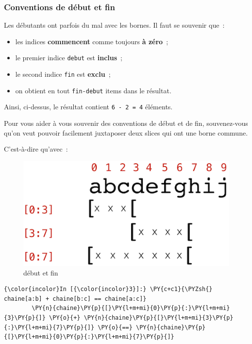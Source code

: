     \hypertarget{conventions-de-duxe9but-et-fin}{%
\subsubsection{Conventions de début et
fin}\label{conventions-de-duxe9but-et-fin}}

    Les débutants ont parfois du mal avec les bornes. Il faut se souvenir
que~:

\begin{itemize}
\tightlist
\item
  les indices \textbf{commencent} comme toujours \textbf{à zéro}~;
\item
  le premier indice \texttt{debut} est \textbf{inclus}~;
\item
  le second indice \texttt{fin} est \textbf{exclu}~;
\item
  on obtient en tout \texttt{fin-debut} items dans le résultat.
\end{itemize}

Ainsi, ci-dessus, le résultat contient \texttt{6\ -\ 2\ =\ 4} éléments.

    Pour vous aider à vous souvenir des conventions de début et de fin,
souvenez-vous qu'on veut pouvoir facilement juxtaposer deux slices qui
ont une borne commune.

C'est-à-dire qu'avec~:

    \begin{figure}[h!]
\centering
\includegraphics{medias/brackets.png}
\caption{début et fin}
\end{figure}

    \begin{Verbatim}[commandchars=\\\{\}]
{\color{incolor}In [{\color{incolor}3}]:} \PY{c+c1}{\PYZsh{} chaine[a:b] + chaine[b:c] == chaine[a:c]}
        \PY{n}{chaine}\PY{p}{[}\PY{l+m+mi}{0}\PY{p}{:}\PY{l+m+mi}{3}\PY{p}{]} \PY{o}{+} \PY{n}{chaine}\PY{p}{[}\PY{l+m+mi}{3}\PY{p}{:}\PY{l+m+mi}{7}\PY{p}{]} \PY{o}{==} \PY{n}{chaine}\PY{p}{[}\PY{l+m+mi}{0}\PY{p}{:}\PY{l+m+mi}{7}\PY{p}{]}
\end{Verbatim}



